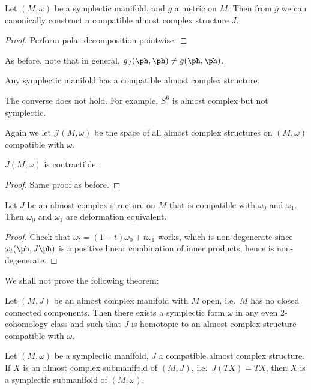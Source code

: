 \documentclass[a4paper]{article}
\begin{document}
\begin{prop}
  Let $(M, \omega)$ be a symplectic manifold, and $g$ a metric on $M$. Then from $g$ we can canonically construct a compatible almost complex structure $J$.
\end{prop}

\begin{proof}
  Perform polar decomposition pointwise.
\end{proof}

As before, note that in general, $g_J(\ph, \ph)\not= g(\ph, \ph)$.

\begin{cor}
  Any symplectic manifold has a compatible almost complex structure.
\end{cor}

The converse does not hold. For example, $S^6$ is almost complex but not symplectic.

Again we let $\mathcal{J}(M, \omega)$ be the space of all almost complex structures on $(M, \omega)$ compatible with $\omega$.
\begin{prop}
  $J(M, \omega)$ is contractible.
\end{prop}
\begin{proof}
  Same proof as before.
\end{proof}

\begin{prop}
  Let $J$ be an almost complex structure on $M$ that is compatible with $\omega_0$ and $\omega_1$. Then $\omega_0$ and $\omega_1$ are deformation equivalent.
\end{prop}

\begin{proof}
  Check that $\omega_t = (1 - t) \omega_0 + t \omega_1$ works, which is non-degenerate since $\omega_t(\ph, J\ph)$ is a positive linear combination of inner products, hence is non-degenerate.
\end{proof}

We shall not prove the following theorem:
\begin{thm}[Gromov]
  Let $(M, J)$ be an almost complex manifold with $M$ open, i.e.\ $M$ has no closed connected components. Then there exists a symplectic form $\omega$ in any even $2$-cohomology class and such that $J$ is homotopic to an almost complex structure compatible with $\omega$.\fakeqed
\end{thm}

\begin{prop}
  Let $(M, \omega)$ be a symplectic manifold, $J$ a compatible almost complex structure. If $X$ is an almost complex submanifold of $(M, J)$, i.e.\ $J(TX) = TX$, then $X$ is a symplectic submanifold of $(M, \omega)$.
\end{prop}
\end{document}
